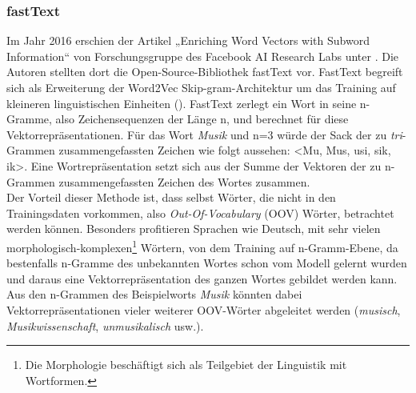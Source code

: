 \documentclass[ngerman]{ttlab-qualify}
\begin{document}
\subsubsection{fastText} \label{fT_grundlage}
Im Jahr 2016 erschien der Artikel „Enriching Word Vectors with Subword Information“ von Forschungsgruppe des Facebook AI Research Labs unter \textcite{DBLP:journals/corr/BojanowskiGJM16}. Die Autoren stellten dort die Open-Source-Bibliothek fastText vor. FastText begreift sich als Erweiterung der Word2Vec Skip-gram-Architektur um das Training auf kleineren linguistischen Einheiten (\cite{DBLP:journals/corr/BojanowskiGJM16}). FastText zerlegt ein Wort in seine n-Gramme, also Zeichensequenzen der Länge n, und berechnet für diese Vektorrepräsentationen. Für das Wort \textit{Musik} und n=3 würde der Sack der zu \textit{tri}-Grammen zusammengefassten Zeichen wie folgt aussehen: <Mu, Mus, usi, sik, ik>. 
Eine Wortrepräsentation setzt sich aus der Summe der Vektoren der zu n-Grammen zusammengefassten Zeichen des Wortes zusammen.\\
Der Vorteil dieser Methode ist, dass selbst Wörter, die nicht in den Trainingsdaten vorkommen, also \textit{Out-Of-Vocabulary} (OOV) Wörter, betrachtet werden können. Besonders profitieren Sprachen wie Deutsch, mit sehr vielen morphologisch-komplexen\footnote{Die Morphologie beschäftigt sich als Teilgebiet der Linguistik mit Wortformen.} Wörtern, von dem Training auf n-Gramm-Ebene, da bestenfalls n-Gramme des unbekannten Wortes schon vom Modell gelernt wurden und daraus eine Vektorrepräsentation des ganzen Wortes gebildet werden kann. Aus den n-Grammen des Beispielworts \textit{Musik} könnten dabei Vektorrepräsentationen vieler weiterer OOV-Wörter abgeleitet werden (\textit{musisch}, \textit{Musikwissenschaft}, \textit{unmusikalisch} usw.).
\end{document}
